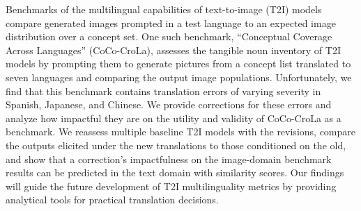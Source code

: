 Benchmarks of the multilingual capabilities of text-to-image (T2I) models compare generated images prompted in a test language to an expected image distribution over a concept set. One such benchmark, ``Conceptual Coverage Across Languages'' (CoCo-CroLa), assesses the tangible noun inventory of T2I models by prompting them to generate pictures from a concept list translated to seven languages and comparing the output image populations. Unfortunately, we find that this benchmark contains translation errors of varying severity in Spanish, Japanese, and Chinese. We provide corrections for these errors and analyze how impactful they are on the utility and validity of CoCo-CroLa as a benchmark. We reassess multiple baseline T2I models with the revisions, compare the outputs elicited under the new translations to those conditioned on the old, and show that a correction's impactfulness on the image-domain benchmark results can be predicted in the text domain with similarity scores. Our findings will guide the future development of T2I multilinguality metrics by providing analytical tools for practical translation decisions.
